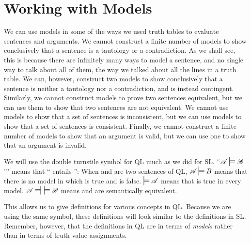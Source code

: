 \section{Working with Models}
\label{sec.UsingModels}

We can use models in some of the ways we used truth tables to evaluate sentences and arguments. We cannot construct a finite number of models to show conclusively that a sentence is a tautology or a contradiction. As we shall see, this is because there are infinitely many ways to model a sentence, and no single way to talk about all of them, the way we talked about all the lines in a truth table. We can, however, construct two models to show conclusively that a sentence is neither a tautology nor a contradiction, and is instead contingent. Similarly, we cannot construct models to prove two sentences equivalent, but we can use them to show that two sentences are not equivalent. We cannot use models to show that a set of sentences is inconsistent, but we can use models to show that a set of sentences is consistent. Finally, we cannot construct a finite number of models to show that an argument is valid, but we can use one to show that an argument is invalid. 

We will use the double turnstile symbol for QL much as we did for SL. ``$\script{A}\sdtstile{}{} \script{B}$''' means that `` entails '': When  and  are two sentences of QL, $\script{A}\sdtstile{}{} {B}$ means that there is no model in which  is true and  is false. $\sdtstile{}{} \script{A}$ means that  is true in every model. $\script{A} \ndststile{}{} \hspace{.5em} \sdtstile{}{} \script{B}$ means  and  are semantically equivalent. 

This allows us to give definitions for various concepts in QL. Because we are using the same symbol, these definitions will look similar to the definitions in SL. Remember, however, that the definitions in QL are in terms of \emph{models} rather than in terms of truth value assignments.

